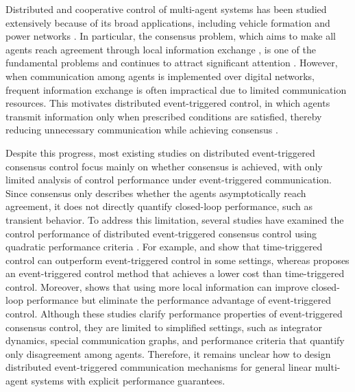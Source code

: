 \documentclass[letterpaper,10pt,conference]{ieeeconf}
\begin{document}
Distributed and cooperative control of multi-agent systems has been studied extensively because of its broad applications, including vehicle formation \cite{ren2008distributed} and power networks \cite{bidram2014distributed}.
In particular, the consensus problem, which aims to make all agents reach agreement through local information exchange \cite{olfati2007consensus}, is one of the fundamental problems and continues to attract significant attention \cite{hengster2013synchronization,jiao2019suboptimality,feng2021consensusability,yuan2025resilient}.
However, when communication among agents is implemented over digital networks, frequent information exchange is often impractical due to limited communication resources.
This motivates distributed event-triggered control, in which agents transmit information only when prescribed conditions are satisfied, thereby reducing unnecessary communication while achieving consensus \cite{garcia2014decentralized,hu2015consensus,nowzari2019event,mishra2023event}.

Despite this progress, most existing studies on distributed event-triggered consensus control focus mainly on whether consensus is achieved, with only limited analysis of control performance under event-triggered communication.
Since consensus only describes whether the agents asymptotically reach agreement, it does not directly quantify closed-loop performance, such as transient behavior.
To address this limitation, several studies have examined the control performance of distributed event-triggered consensus control using quadratic performance criteria \cite{meister2022analysis,meister2024time,antunes2023consistent,meister2026improving}.
For example, \cite{meister2022analysis} and \cite{meister2024time} show that time-triggered control can outperform event-triggered control in some settings, whereas \cite{antunes2023consistent} proposes an event-triggered control method that achieves a lower cost than time-triggered control.
Moreover, \cite{meister2026improving} shows that using more local information can improve closed-loop performance but eliminate the performance advantage of event-triggered control.
Although these studies clarify performance properties of event-triggered consensus control, they are limited to simplified settings, such as integrator dynamics, special communication graphs, and performance criteria that quantify only disagreement among agents.
Therefore, it remains unclear how to design distributed event-triggered communication mechanisms for general linear multi-agent systems with explicit performance guarantees.
\end{document}
